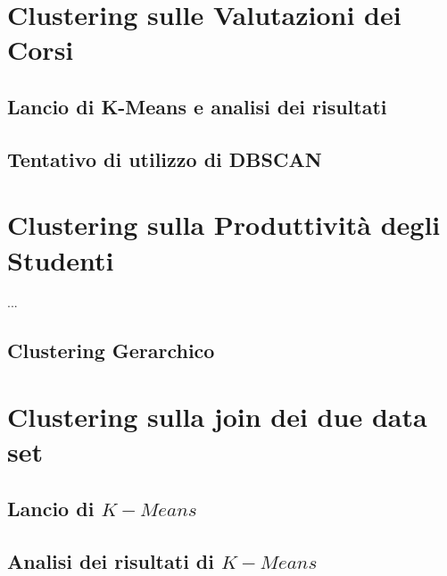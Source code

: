 \section{Clustering sulle Valutazioni dei Corsi}

    \subsection{Lancio di K-Means e analisi dei risultati}

    \subsection{Tentativo di utilizzo di DBSCAN}

\section{Clustering sulla Produttività degli Studenti}

    ...

    \subsection{Clustering Gerarchico}

\section{Clustering sulla join dei due data set}

    \subsection{Lancio di $K-Means$}

    \subsection{Analisi dei risultati di $K-Means$}